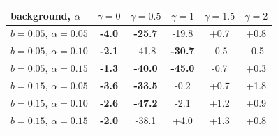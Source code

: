 \begin{tabular}{lccccc}
\toprule
background, $\alpha$ & $\gamma=0$ & $\gamma=0.5$ & $\gamma=1$ & $\gamma=1.5$ & $\gamma=2$ \\
\midrule
$b=0.05$, $\alpha=0.05$ & \textbf{-4.0} & \textbf{-25.7} & -19.8 & +0.7 & +0.8 \\
$b=0.05$, $\alpha=0.10$ & \textbf{-2.1} & -41.8 & \textbf{-30.7} & -0.5 & -0.5 \\
$b=0.05$, $\alpha=0.15$ & \textbf{-1.3} & \textbf{-40.0} & \textbf{-45.0} & -0.7 & +0.3 \\
$b=0.15$, $\alpha=0.05$ & \textbf{-3.6} & \textbf{-33.5} & -0.2 & +0.7 & +1.8 \\
$b=0.15$, $\alpha=0.10$ & \textbf{-2.6} & \textbf{-47.2} & -2.1 & +1.2 & +0.9 \\
$b=0.15$, $\alpha=0.15$ & \textbf{-2.0} & -38.1 & +4.0 & +1.3 & +0.8 \\
\bottomrule
\end{tabular}